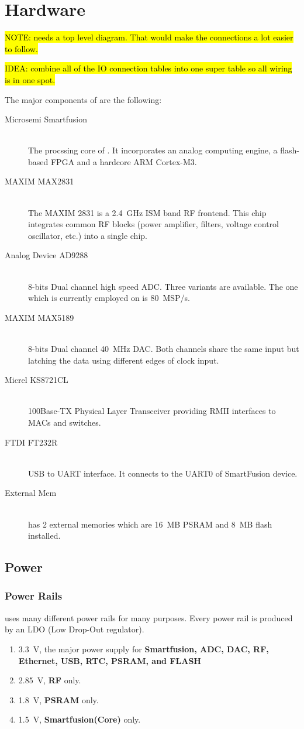 \chapter{Hardware}

\hl{NOTE: needs a top level diagram. That would make the connections a lot easier to follow.}

\hl{IDEA: combine all of the IO connection tables into one super table so all wiring is in one spot.}

The major components of \sdr are the following:
\begin{description}
	\item[Microsemi Smartfusion] \hfill \\
	The procssing core of \sdr. It incorporates an
	analog computing engine, a flash-based FPGA and a hardcore ARM Cortex-M3.
	\item[MAXIM MAX2831] \hfill \\
	The MAXIM 2831 is a 2.4~GHz ISM band RF frontend. This
	chip integrates common RF blocks (power amplifier, filters, voltage
	control oscillator, etc.) into a single chip.
	\item[Analog Device AD9288] \hfill \\
	8-bits Dual channel high speed ADC. Three variants
	are available. The one which is currently employed on \sdr is 80~MSP/s.
	\item[MAXIM MAX5189] \hfill \\
	8-bits Dual channel 40~MHz DAC. Both channels share
	the same input but latching the data using different edges of clock input.
	\item[Micrel KS8721CL] \hfill \\
	100Base-TX Physical Layer Transceiver providing RMII interfaces to MACs
	and switches.
	\item[FTDI FT232R] \hfill \\
	USB to UART interface. It connects to the UART0 of SmartFusion device.
	\item[External Mem] \hfill \\
	\sdr has 2 external memories which are 16~MB PSRAM and 8~MB flash installed.

\end{description}

\section{Power}
\subsection{Power Rails}
\sdr uses many different power rails for many purposes. Every power rail is produced by an
LDO (Low Drop-Out regulator).
\begin{enumerate}
	\item 3.3~V, the major power supply for {\bf Smartfusion, ADC, DAC, RF, Ethernet,
	USB, RTC, PSRAM, and FLASH}
	\item 2.85~V, {\bf RF} only.
	\item 1.8~V, {\bf PSRAM} only.
	\item 1.5~V, {\bf Smartfusion(Core)} only.
\end{enumerate}

